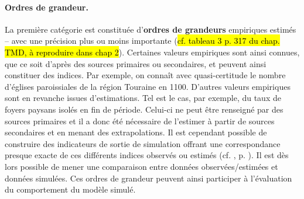 \paragraph{Ordres de grandeur.}
La première catégorie est constituée d'\textbf{ordres de grandeurs} empiriques estimés -- avec une précision plus ou moins importante (\hl{cf. tableau 3 p. 317 du chap. TMD, à reproduire dans chap 2}).
Certaines valeurs empiriques sont ainsi connues, que ce soit d'après des sources primaires ou secondaires, et peuvent ainsi constituer des indices.
Par exemple, on connaît avec quasi-certitude le nombre d'églises paroissiales de la région Touraine en 1100.
D'autres valeurs empiriques sont en revanche issues d'estimations.
Tel est le cas, par exemple, du taux de foyers paysans isolés en fin de période.
Celui-ci ne peut être renseigné par des sources primaires et il a donc été nécessaire de l'estimer à partir de sources secondaires et en menant des extrapolations.
Il est cependant possible de construire des indicateurs de sortie de simulation offrant une correspondance presque exacte de ces différents indices observés ou estimés (cf. , p. \pageref{par:correspondance}).
Il est dès lors possible de mener une comparaison entre données observées/estimées et données simulées.
Ces ordres de grandeur peuvent ainsi participer à l'évaluation du comportement du modèle simulé.

